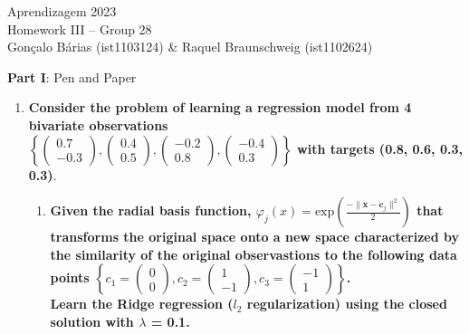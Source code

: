 \documentclass[12pt]{article}
\begin{document}
\begin{center}
\large{Aprendizagem 2023}\\
Homework III -- Group 28\\
\vskip 0.3cm
Gonçalo Bárias (ist1103124) \& Raquel Braunschweig (ist1102624)\vskip 1cm

\large{\textbf{Part I}: Pen and Paper}\normalsize
\end{center}

\begin{enumerate}[leftmargin=\labelsep]
    \item \textbf{Consider the problem of learning a regression model from 4 bivariate observations} \\

          \vskip -0.2cm
          \textbf{$\left\{\begin{pmatrix} 0.7 \\ -0.3 \end{pmatrix}, \begin{pmatrix} 0.4 \\ 0.5 \end{pmatrix}, \begin{pmatrix} -0.2 \\ 0.8 \end{pmatrix},
          \begin{pmatrix} -0.4 \\ 0.3 \end{pmatrix}\right\}$ with targets (0.8, 0.6, 0.3, 0.3)}.

    \begin{enumerate}
        \item \textbf{Given the radial basis function, $\varphi_j(x) = \text{exp}({ \frac{-\| \mathbf{x} - \mathbf{c}_j \|^2}{2} })$ that transforms
              the original space onto a new space characterized by the similarity of the original observastions to the following data points
              $\left\{ c_1 = \begin{pmatrix} 0 \\ 0 \end{pmatrix}, c_2 = \begin{pmatrix} 1 \\ -1 \end{pmatrix}, c_3 = \begin{pmatrix} -1 \\ 1 \end{pmatrix}\right\}$. \\
              Learn the Ridge regression ($l_2$ regularization) using the closed solution with $\lambda$ = 0.1.}


\end{enumerate}
\end{enumerate}
\end{document}
